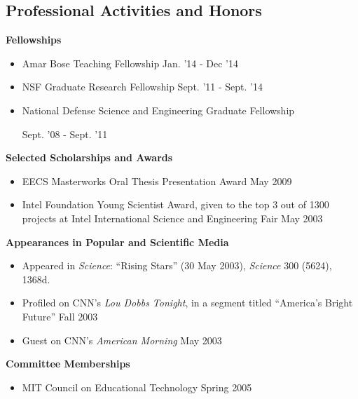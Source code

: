 \documentclass[margin]{res}
\begin{document}
\begin{resume}
\section{Professional Activities and Honors} 

               {\bf Fellowships}  
                \begin{itemize} \itemsep -2pt
\item Amar Bose Teaching Fellowship \hfill Jan. '14 - Dec '14
\item NSF Graduate Research Fellowship \hfill Sept. '11 - Sept. '14
              \item National Defense Science and Engineering Graduate Fellowship
\begin{flushright}
Sept. '08 - Sept. '11
\end{flushright}       
          
               \end{itemize}

{\bf Selected Scholarships and Awards}
                   \begin{itemize} \itemsep -2pt
\item EECS Masterworks Oral Thesis Presentation Award \hfill May 2009   
                
                 \item Intel Foundation Young Scientist Award, given to the top 3 out of 1300 projects at Intel International Science and Engineering Fair \hfill May 2003 


		 \end{itemize}

		 {\bf Appearances in Popular and Scientific Media}
\begin{itemize} \itemsep -2pt
\item Appeared in \textit{Science}: ``Rising Stars'' (30 May 2003), \textit{Science} 300 (5624), 1368d.
\item Profiled on CNN's \textit{Lou Dobbs Tonight}, in a segment titled ``America's Bright Future''  \hfill Fall 2003 
\item Guest on CNN's \textit{American Morning} \hfill May 2003

 \end{itemize}

		 {\bf  Committee Memberships}  
                 \begin{itemize} \itemsep -2pt

               \item    MIT Council on Educational Technology \hfill Spring 2005 
                 

\end{itemize}
\end{resume}
\end{document}
